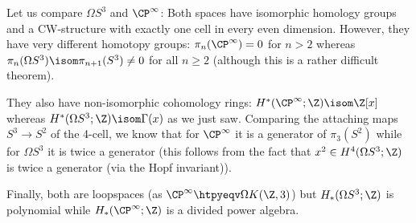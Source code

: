 \begin{remark}
	Let us compare $\Omega S^3$ and $\CP^\infty$:
	Both spaces have isomorphic homology groups and a CW-structure with exactly one cell in every even dimension.
	However, they have very different homotopy groups: $\pi_n(\CP^\infty) = 0$ for $n > 2$ whereas $\pi_n(\Omega S^3) \isom \pi_{n + 1}(S^3) \neq 0$ for all $n \geq 2$ (although this is a rather difficult theorem).

	They also have non-isomorphic cohomology rings: $H^*(\CP^\infty; \Z) \isom \Z[x]$ whereas $H^*(\Omega S^3; \Z) \isom \Gamma(x)$ as we just saw.
	Comparing the attaching maps $S^3 \to S^2$ of the 4-cell, we know that for $\CP^\infty$ it is a generator of $\pi_3(S^2)$ while for $\Omega S^3$ it is twice a generator (this follows from the fact that $x^2 \in H^4(\Omega S^3; \Z)$ is twice a generator (via the Hopf invariant)).

	Finally, both are loopspaces (as $\CP^\infty \htpyeqv \Omega K(\Z, 3)$) but $H_*(\Omega S^3; \Z)$ is polynomial while $H_*(\CP^\infty; \Z)$ is a divided power algebra.
\end{remark}
